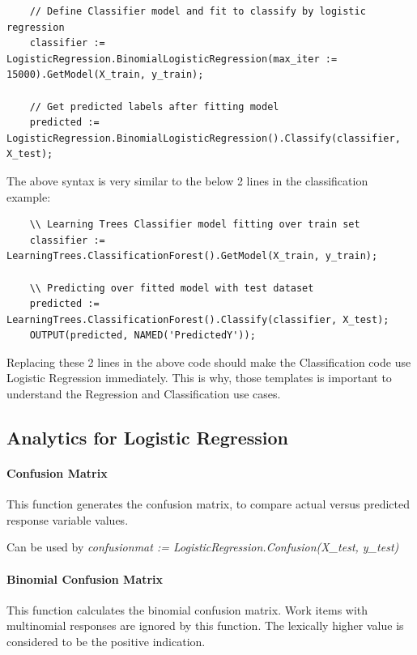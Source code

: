 \documentclass[a4paper,oneside,12pt]{book}
\begin{document}
\begin{lstlisting}
    // Define Classifier model and fit to classify by logistic regression
    classifier := LogisticRegression.BinomialLogisticRegression(max_iter := 15000).GetModel(X_train, y_train);

    // Get predicted labels after fitting model
    predicted := LogisticRegression.BinomialLogisticRegression().Classify(classifier, X_test);
\end{lstlisting}

The above syntax is very similar to the below 2 lines in the classification example:

\begin{lstlisting}
    \\ Learning Trees Classifier model fitting over train set
    classifier := LearningTrees.ClassificationForest().GetModel(X_train, y_train);
    
    \\ Predicting over fitted model with test dataset
    predicted := LearningTrees.ClassificationForest().Classify(classifier, X_test);
    OUTPUT(predicted, NAMED('PredictedY'));
\end{lstlisting}

Replacing these 2 lines in the above code should make the Classification code use Logistic Regression immediately. This is why, those templates is important to understand the Regression and Classification use cases.

\subsection{Analytics for Logistic Regression}

\paragraph{Confusion Matrix}

This function generates the confusion matrix, to compare actual versus predicted response variable values.

Can be used by \textit{confusionmat := LogisticRegression.Confusion(X\_test, y\_test)}

\paragraph{Binomial Confusion Matrix}

This function calculates the binomial confusion matrix. Work items with multinomial responses are ignored by this function. The lexically higher value is considered to be the positive indication.
\end{document}

